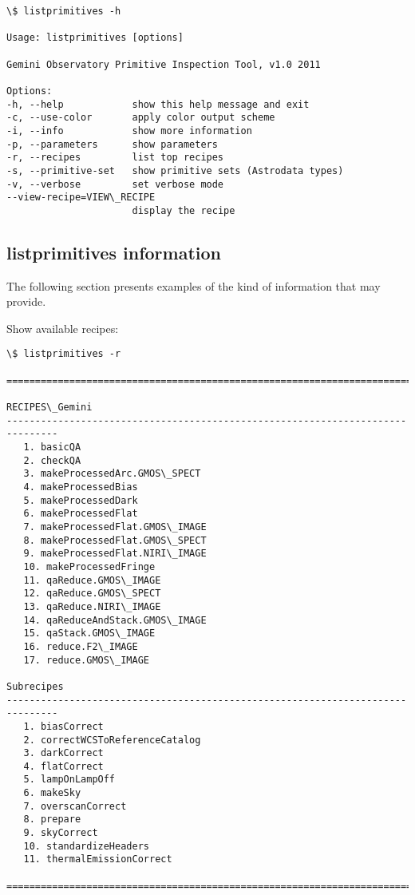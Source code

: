 \documentclass[letterpaper,10pt,english]{sphinxmanual}
\begin{document}
\begin{Verbatim}[commandchars=\\\{\}]
\$ listprimitives -h

Usage: listprimitives [options]

Gemini Observatory Primitive Inspection Tool, v1.0 2011

Options:
-h, --help            show this help message and exit
-c, --use-color       apply color output scheme
-i, --info            show more information
-p, --parameters      show parameters
-r, --recipes         list top recipes
-s, --primitive-set   show primitive sets (Astrodata types)
-v, --verbose         set verbose mode
--view-recipe=VIEW\_RECIPE
                      display the recipe
\end{Verbatim}


\subsection{listprimitives information}
\label{supptools:listprimitives-information}
The following section presents examples of the kind of information that
 may provide.

Show available recipes:

\begin{Verbatim}[commandchars=\\\{\}]
\$ listprimitives -r

===============================================================================

RECIPES\_Gemini
-------------------------------------------------------------------------------
   1. basicQA
   2. checkQA
   3. makeProcessedArc.GMOS\_SPECT
   4. makeProcessedBias
   5. makeProcessedDark
   6. makeProcessedFlat
   7. makeProcessedFlat.GMOS\_IMAGE
   8. makeProcessedFlat.GMOS\_SPECT
   9. makeProcessedFlat.NIRI\_IMAGE
   10. makeProcessedFringe
   11. qaReduce.GMOS\_IMAGE
   12. qaReduce.GMOS\_SPECT
   13. qaReduce.NIRI\_IMAGE
   14. qaReduceAndStack.GMOS\_IMAGE
   15. qaStack.GMOS\_IMAGE
   16. reduce.F2\_IMAGE
   17. reduce.GMOS\_IMAGE

Subrecipes
-------------------------------------------------------------------------------
   1. biasCorrect
   2. correctWCSToReferenceCatalog
   3. darkCorrect
   4. flatCorrect
   5. lampOnLampOff
   6. makeSky
   7. overscanCorrect
   8. prepare
   9. skyCorrect
   10. standardizeHeaders
   11. thermalEmissionCorrect

===============================================================================
\end{Verbatim}
\end{document}
